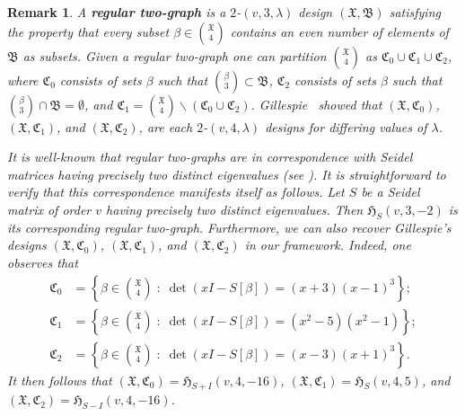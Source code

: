 \documentclass[11pt]{article}
\newtheorem{remark}[theorem]{Remark}
\begin{document}
\begin{remark}
    A \textbf{regular two-graph} is a $2$-$(v,3,\lambda)$ design $(\mathfrak X, \mathfrak B)$ satisfying the property that every subset $\beta \in \binom{\mathfrak X}{4}$ contains an even number of elements of $\mathfrak B$ as subsets.
    Given a regular two-graph one can partition $\binom{\mathfrak X}{4}$ as $\mathfrak C_0 \cup \mathfrak C_1 \cup \mathfrak C_2$, where $\mathfrak C_0$ consists of sets $\beta$ such that $\binom{\beta}{3} \subset \mathfrak B$, $\mathfrak C_2$ consists of sets $\beta$ such that $\binom{\beta}{3} \cap \mathfrak B = \emptyset$, and $\mathfrak C_1 = \binom{\mathfrak X}{4} \backslash (\mathfrak C_0 \cup \mathfrak C_2)$.
    Gillespie~\cite[Proposition 4.1]{G2018} showed that $(\mathfrak X, \mathfrak C_0)$, $(\mathfrak X, \mathfrak C_1)$, and $(\mathfrak X, \mathfrak C_2)$, are each $2$-$(v,4,\lambda)$ designs for differing values of $\lambda$.
    
    It is well-known that regular two-graphs are in correspondence with Seidel matrices having precisely two distinct eigenvalues (see \cite[Theorem 4.1 and Section 7]{Seidel}).
    It is straightforward to verify that this correspondence manifests itself as follows.
    Let $S$ be a Seidel matrix of order $v$ having precisely two distinct eigenvalues.
    Then $\mathfrak H_{S}(v,3,-2)$ is its corresponding regular two-graph.
    Furthermore, we can also recover Gillespie's designs $(\mathfrak X, \mathfrak C_0)$, $(\mathfrak X, \mathfrak C_1)$, and $(\mathfrak X, \mathfrak C_2)$ in our framework. 
    Indeed, one observes that
    \begin{align*}
        \mathfrak C_0 &= \left \{ \beta \in \binom{\mathfrak X}{4} \; : \; \det(xI - S[\beta]) = (x+3)(x-1)^3 \right \}; \\
        \mathfrak C_1 &= \left \{ \beta \in \binom{\mathfrak X}{4} \; : \; \det(xI - S[\beta]) = (x^2-5)(x^2-1) \right \}; \\
        \mathfrak C_2 &= \left \{ \beta \in \binom{\mathfrak X}{4} \; : \; \det(xI - S[\beta]) = (x-3)(x+1)^3 \right \}.
    \end{align*}
    It then follows that $(\mathfrak X, \mathfrak C_0) = \mathfrak H_{S+I}(v,4,-16)$, $(\mathfrak X, \mathfrak C_1)= \mathfrak H_{S}(v,4,5)$, and $(\mathfrak X, \mathfrak C_2)= \mathfrak H_{S-I}(v,4,-16)$. 
\end{remark}
\end{document}
